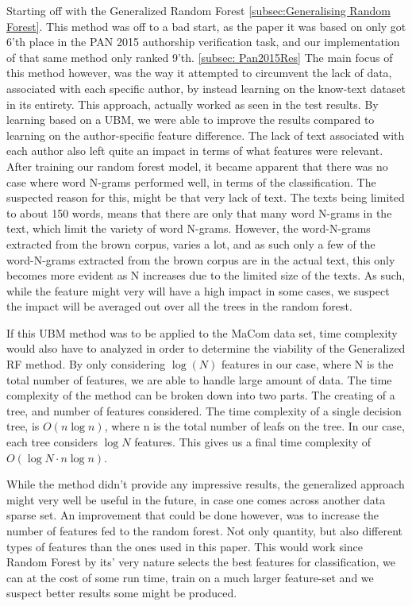 Starting off with the Generalized Random Forest \ref{subsec:Generalising Random
Forest}. This method was off to a bad start, as the paper it was based on
\cite{pacheco2015} only got 6'th place in the PAN 2015 authorship verification
task, and our implementation of that same method only ranked 9'th. \ref{subsec:
Pan2015Res} The main focus of this method however, was the way it attempted to
circumvent the lack of data, associated with each specific author, by instead
learning on the know-text dataset in its entirety. This approach, actually
worked as seen in the test results. By learning based on a \gls{UBM}, we were
able to improve the results compared to learning on the author-specific feature
difference. The lack of text associated with each author also left quite an
impact in terms of what features were relevant. After training our random forest
model, it became apparent that there was no case where word N-grams performed
well, in terms of the classification. The suspected reason for this, might be
that very lack of text. The texts being limited to about 150 words, means that
there are only that many word N-grams in the text, which limit the variety of
word N-grams. However, the word-N-grams extracted from the brown corpus, varies
a lot, and as such only a few of the word-N-grams extracted from the brown
corpus are in the actual text, this only becomes more evident as N increases due
to the limited size of the texts. As such, while the feature might very will
have a high impact in some cases, we suspect the impact will be averaged out
over all the trees in the random forest.

If this \gls{UBM} method was to be applied to the MaCom data set, time
complexity would also have to analyzed in order to determine the viability of
the Generalized RF method. By only considering $\log(N)$ features in our case,
where N is the total number of features, we are able to handle large amount of
data. The time complexity of the method can be broken down into two parts. The
creating of a tree, and number of features considered. The time complexity of a
single decision tree, is $O(n \log{n})$, where n is the total number of leafs on
the tree. In our case, each tree considers $\log{N}$ features. This gives us a
final time complexity of $O(\log{N} \cdot n \log{n})$.\cite{RFTime}

While the method didn't provide any impressive results, the generalized approach
might very well be useful in the future, in case one comes across another data
sparse set. An improvement that could be done however, was to increase the
number of features fed to the random forest. Not only quantity, but also
different types of features than the ones used in this paper. This would
work since Random Forest by its' very nature selects the best features for
classification, we can at the cost of some run time, train on a much larger
feature-set and we suspect better results some might be produced.

